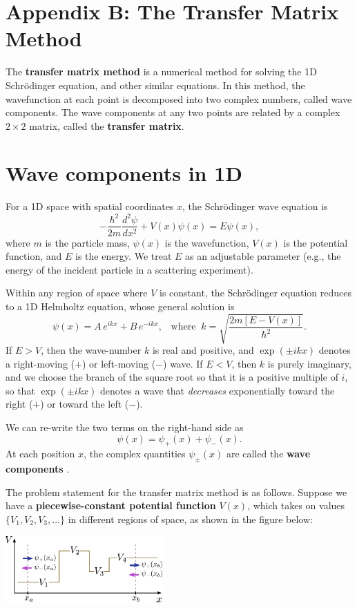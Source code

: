 \documentclass[pra,12pt]{revtex4}
\begin{document}
\section*{Appendix B: The Transfer Matrix Method}

The \textbf{transfer matrix method} is a numerical method for solving
the 1D Schr\"odinger equation, and other similar equations.  In this
method, the wavefunction at each point is decomposed into two complex
numbers, called wave components.  The wave components at any two
points are related by a complex $2\times2$ matrix, called the
\textbf{transfer matrix}.

\section{Wave components in 1D}

For a 1D space with spatial coordinates $x$, the Schr\"odinger wave
equation is
$$-\frac{\hbar^2}{2m}\frac{d^2\psi}{dx^2} + V(x) \psi(x) = E\psi(x),$$
where $m$ is the particle mass, $\psi(x)$ is the wavefunction, $V(x)$
is the potential function, and $E$ is the energy.  We treat $E$ as an
adjustable parameter (e.g., the energy of the incident particle in a
scattering experiment).

Within any region of space where $V$ is constant, the Schr\"odinger
equation reduces to a 1D Helmholtz equation, whose general solution is
$$\psi(x) = A\, e^{ik x} + B\, e^{-ik x}, \;\;\; \mathrm{where}\;\; k = \sqrt{\frac{2m[E-V(x)]}{\hbar^2}}.$$
If $E > V$, then the wave-number $k$ is real and positive, and
$\exp(\pm ikx)$ denotes a right-moving ($+$) or left-moving ($-$)
wave.  If $E < V$, then $k$ is purely imaginary, and we choose the
branch of the square root so that it is a positive multiple of $i$, so
that $\exp(\pm ikx)$ denotes a wave that \textit{decreases}
exponentially toward the right ($+$) or toward the left ($-$).

We can re-write the two terms on the right-hand side as
$$\psi(x) = \psi_+(x) + \psi_-(x).$$
At each position $x$, the complex quantities $\psi_\pm(x)$ are called
the \textbf{wave components} .

The problem statement for the transfer matrix method is as follows.
Suppose we have a \textbf{piecewise-constant potential function}
$V(x)$, which takes on values $\{V_1, V_2, V_3, \dots\}$ in different
regions of space, as shown in the figure below:

\begin{center}
  \includegraphics[width=0.45\textwidth]{transfer_matrix_setup}
\end{center}
\end{document}
